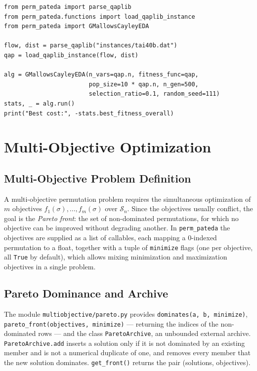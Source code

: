 \documentclass[a4paper,11pt]{article}
\begin{document}
\begin{lstlisting}
from perm_pateda import parse_qaplib
from perm_pateda.functions import load_qaplib_instance
from perm_pateda import GMallowsCayleyEDA

flow, dist = parse_qaplib("instances/tai40b.dat")
qap = load_qaplib_instance(flow, dist)

alg = GMallowsCayleyEDA(n_vars=qap.n, fitness_func=qap,
                        pop_size=10 * qap.n, n_gen=500,
                        selection_ratio=0.1, random_seed=111)
stats, _ = alg.run()
print("Best cost:", -stats.best_fitness_overall)
\end{lstlisting}

\section{Multi-Objective Optimization}
\label{sec:multiobjective}

\subsection{Multi-Objective Problem Definition}

A multi-objective permutation problem requires the simultaneous optimization of
$m$ objectives $f_1(\sigma), \ldots, f_m(\sigma)$ over $\mathcal{S}_n$.  Since
the objectives usually conflict, the goal is the \emph{Pareto front}: the set of
non-dominated permutations, for which no objective can be improved without
degrading another.  In \texttt{perm\_pateda} the objectives are supplied as a
list of callables, each mapping a 0-indexed permutation to a float, together with
a tuple of \texttt{minimize} flags (one per objective, all \texttt{True} by
default), which allows mixing minimization and maximization objectives in a
single problem.

\subsection{Pareto Dominance and Archive}

The module \texttt{multiobjective/pareto.py} provides
\texttt{dominates(a, b, minimize)}, \texttt{pareto\_front(objectives, minimize)}
--- returning the indices of the non-dominated rows --- and the class
\texttt{ParetoArchive}, an unbounded external archive.  \texttt{ParetoArchive.add}
inserts a solution only if it is not dominated by an existing member and is not a
numerical duplicate of one, and removes every member that the new solution
dominates.  \texttt{get\_front()} returns the pair (solutions, objectives).
\end{document}
